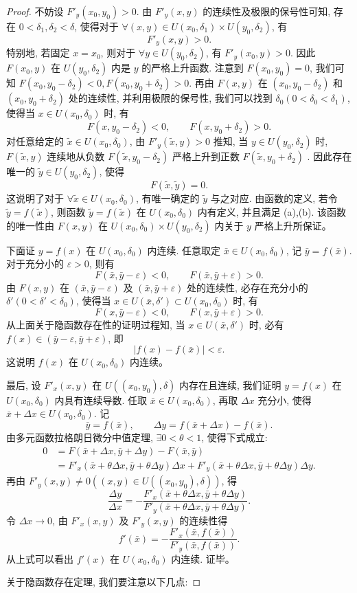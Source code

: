\documentclass[UTF8,12pt,a4paper,fontset=fandol]{ctexart}
\begin{document}
\begin{proof}\quad 不妨设 $F'_y(x_0,y_0)>0$. 由 $F'_y(x,y)$ 的连续性及极限的保号性可知, 存在 $0<\delta_1,\delta_2<\delta$, 使得对于 $\forall(x,y)\in U(x_0,\delta_1)\times U(y_0,\delta_2)$, 有
\[
  F'_y(x,y)>0.
\]
特别地, 若固定 $x=x_0$, 则对于 $\forall y\in U(y_0,\delta_2)$, 有 $F'_y(x_0,y)>0$. 因此 $F(x_0,y)$ 在 $U(y_0,\delta_2)$ 内是 $y$ 的严格上升函数. 注意到 $F(x_0,y_0)=0$, 我们可知 $F(x_0,y_0-\delta_2)<0,F(x_0,y_0+\delta_2)>0$. 再由 $F(x,y)$ 在 $(x_0,y_0-\delta_2)$ 和 $(x_0,y_0+\delta_2)$ 处的连续性, 并利用极限的保号性, 我们可以找到 $\delta_0(0<\delta_0<\delta_1)$, 使得当 $x\in U(x_0,\delta_0)$ 时, 有
\[
  F(x,y_0-\delta_2)<0,\qquad F(x,y_0+\delta_2)>0.
\]
对任意给定的 $\tilde x\in U(x_0,\delta_0)$, 由 $F'_y(\tilde x,y)>0$ 推知, 当 $y\in U(y_0,\delta_2)$ 时, $F(\tilde x,y)$ 连续地从负数 $F(\tilde x,y_0-\delta_2)$ 严格上升到正数 $F(\tilde x,y_0+\delta_2)$ . 因此存在唯一的 $\tilde y\in U(y_0,\delta_2)$, 使得
\[
  F(\tilde x,\tilde y)=0.
\]
这说明了对于 $\forall\tilde x\in U(x_0,\delta_0)$, 有唯一确定的 $\tilde y$ 与之对应. 由函数的定义, 若令 $\tilde y=f(\tilde x)$, 则函数 $\tilde y=f(\tilde x)$ 在 $U(x_0,\delta_0)$ 内有定义, 并且满足 (a),(b). 该函数的唯一性由 $F(x,y)$ 在 $U(x_0,\delta_0)\times U(y_0,\delta_2)$ 内关于 $y$ 严格上升所保证。

下面证 $y=f(x)$ 在 $U(x_0,\delta_0)$ 内连续. 任意取定 $\bar x\in U(x_0,\delta_0)$, 记 $\bar y=f(\bar x)$. 对于充分小的 $\varepsilon>0$, 则有
\[
  F(\bar x,\bar y-\varepsilon)<0,\qquad F(\bar x,\bar y+\varepsilon)>0.
\]
由 $F(x,y)$ 在 $(\bar x,\bar y-\varepsilon)$ 及 $(\bar x,\bar y+\varepsilon)$ 处的连续性, 必存在充分小的 $\delta'(0<\delta'<\delta_0)$, 使得当 $x\in U(\bar x,\delta')\subset U(x_0,\delta_0)$ 时, 有
\[
  F(x,\bar y-\varepsilon)<0,\qquad F(x,\bar y+\varepsilon)>0.
\]
从上面关于隐函数存在性的证明过程知, 当 $x\in U(\bar x,\delta')$ 时, 必有 $f(x)\in(\bar y-\varepsilon,\bar y+\varepsilon)$, 即
\[
  |f(x)-f(\bar x)|<\varepsilon.
\]
这说明 $f(x)$ 在 $U(x_0,\delta_0)$ 内连续。

最后, 设 $F'_x(x,y)$ 在 $U((x_0,y_0),\delta)$ 内存在且连续, 我们证明 $y=f(x)$ 在 $U(x_0,\delta_0)$ 内具有连续导数. 任取 $\bar x\in U(x_0,\delta_0)$, 再取 $\Delta x$ 充分小, 使得 $\bar x+\Delta x\in U(x_0,\delta_0)$. 记
\[
  \bar y=f(\bar x),\qquad
  \Delta y=f(\bar x+\Delta x)-f(\bar x).
\]
由多元函数拉格朗日微分中值定理, $\exists0<\theta<1$, 使得下式成立:
\[
\begin{aligned}
  0&=F(\bar x+\Delta x,\bar y+\Delta y)-F(\bar x,\bar y)\\
  &=F'_x(\bar x+\theta\Delta x,\bar y+\theta\Delta y)\Delta x
  +F'_y(\bar x+\theta\Delta x,\bar y+\theta\Delta y)\Delta y.
\end{aligned}
\]
再由 $F'_y(x,y)\ne0((x,y)\in U((x_0,y_0),\delta))$, 得
\[
  \frac{\Delta y}{\Delta x}
  =-\frac{F'_x(\bar x+\theta\Delta x,\bar y+\theta\Delta y)}
  {F'_y(\bar x+\theta\Delta x,\bar y+\theta\Delta y)}.
\]
令 $\Delta x\to0$, 由 $F'_x(x,y)$ 及 $F'_y(x,y)$ 的连续性得
\[
  f'(\bar x)=-\frac{F'_x(\bar x,f(\bar x))}{F'_y(\bar x,f(\bar x))}.
\]
从上式可以看出 $f'(x)$ 在 $U(x_0,\delta_0)$ 内连续. 证毕。

关于隐函数存在定理, 我们要注意以下几点:

\end{proof}
\end{document}
